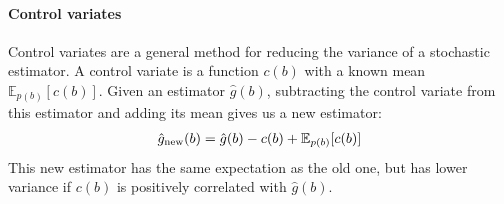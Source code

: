 \documentclass{article}
\newcommand{\controlf}{c}  %
\newcommand{\vu}{\mathbf{u}}
\newcommand{\PT}{\frac{\partial}{\partial \theta}}
\begin{document}
%
%


\paragraph{Control variates}
Control variates are a general method for reducing the variance of a stochastic estimator.
A control variate is a function $\controlf(b)$ with a known mean $\mathbb{E}_{p(b)} [ \controlf(b) ]$.
Given an estimator $\hat g(b)$, subtracting the control variate from this estimator and adding its mean gives us a new estimator:
%
\begin{align}
\hat g_\textnormal{new}(b) = \hat g(b) - \controlf(b) + \mathbb{E}_{p(b)}[\controlf(b)]
\end{align}
%
This new estimator has the same expectation as the old one, 
%
%
but has lower variance if $\controlf(b)$ is positively correlated with $\hat g(b)$.
\end{document}
